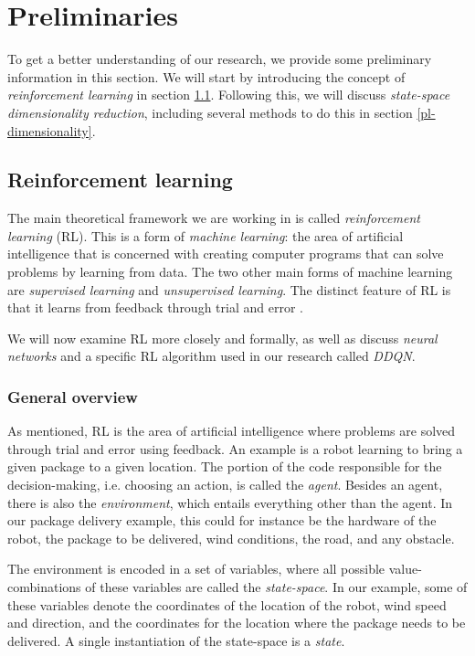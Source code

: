\chapter{Preliminaries}\label{preliminaries}
To get a better understanding of our research, we provide some preliminary information in this section. We will start by introducing the concept of \emph{reinforcement learning} in section \ref{pl-rl}. Following this, we will discuss \emph{state-space dimensionality reduction}, including several methods to do this in section \ref{pl-dimensionality}.
 
\section{Reinforcement learning}\label{pl-rl}
The main theoretical framework we are working in is called \emph{reinforcement learning} (RL). This is a form of \emph{machine learning}: the area of artificial intelligence that is concerned with creating computer programs that can solve problems by learning from data. The two other main forms of machine learning are \emph{supervised learning} and \emph{unsupervised  learning}. The distinct feature of RL is that it learns from feedback through trial and error \cite[p. 2-5]{grokking}.

We will now examine RL more closely and formally, as well as discuss \emph{neural networks} and a specific RL algorithm used in our research called \emph{DDQN}.

 
\subsection{General overview}
As mentioned, RL is the area of artificial intelligence where problems are solved through trial and error using feedback. An example is a robot learning to bring a given package to a given location. The portion of the code responsible for the decision-making, i.e. choosing an action, is called the \emph{agent}. Besides an agent, there is also the \emph{environment}, which entails everything other than the agent. In our package delivery example, this could for instance be the hardware of the robot, the package to be delivered, wind conditions, the road, and any obstacle.

The environment is encoded in a set of variables, where all possible value-combinations of these variables are called the \emph{state-space}. In our example, some of these variables denote the coordinates of the location of the robot, wind speed and direction, and the coordinates for the location where the package needs to be delivered. A single instantiation of the state-space is a \emph{state}. 


